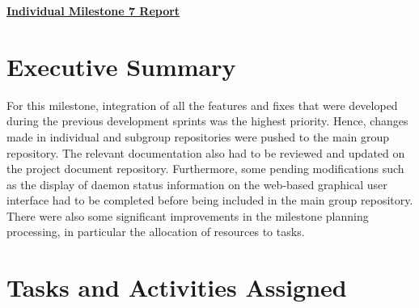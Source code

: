 \documentclass{article}
\begin{document}
\pagestyle{headings}

\begin{center}
{\LARGE\textbf{\underline{{Individual Milestone 7 Report}}}}
\end{center}

\section*{Executive Summary}

For this milestone, integration of all the features and fixes that were developed during the previous development sprints was the highest priority. Hence, changes made in individual and subgroup repositories were pushed to the main group repository. The relevant documentation also had to be reviewed and updated on the project document repository. Furthermore, some pending modifications such as the display of daemon status information on the web-based graphical user interface had to be completed before being included in the main group repository. There were also some significant improvements in the milestone planning processing, in particular the allocation of resources to tasks.

\section*{Tasks and Activities Assigned}
\end{document}
